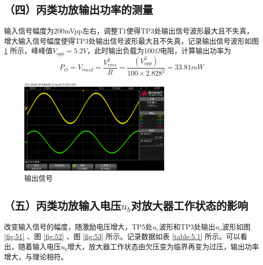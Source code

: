 \documentclass[UTF8]{ctexart}
\begin{document}
\subsection*{（四）丙类功放输出功率的测量}
输入信号幅度为200mVpp左右，调整T1使得TP3处输出信号波形最大且不失真，增大输入信号幅度使得TP3处输出信号波形最大且不失真，记录输出信号波形如图 \ref{fig:41} 所示，峰峰值$V_{opp}=5.2V$，此时输出负载为100$\Omega$电阻，计算输出功率为
\[P_O=V_{rmsI}=\dfrac{V_{rms}^2}{R}=\dfrac{(V_{opp}^2)}{100\times 2.828^2}=33.81mW\]
\begin{figure}[H]
    \centering
    \includegraphics[width=0.65\textwidth]{pics/41.png}

    \caption{输出信号}\label{fig:41}
\end{figure}
\subsection*{（五）丙类功放输入电压\texorpdfstring{$u_b$}{}对放大器工作状态的影响}
改变输入信号的幅度，随激励电压增大，TP5处$u_e$波形和TP3处输出$u_o$波形如图 \ref{fig:51} 、图 \ref{fig:52} 、图 \ref{fig:53} 所示。记录数据如表 \ref{table:5.1} 所示。可以看出，随着输入电压$u_b$增大，放大器工作状态由欠压变为临界再变为过压，输出功率增大，与理论相符。
\end{document}
